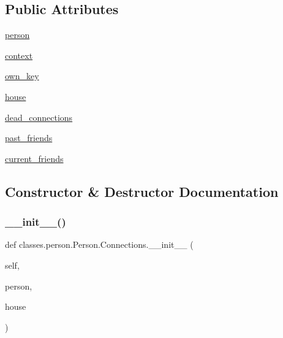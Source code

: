 \subsection*{Public Attributes}
\begin{DoxyCompactItemize}
\item 
\hyperlink{classclasses_1_1person_1_1Person_1_1Connections_a7106d04e396d6fd3c4adab956767b97b}{person}
\item 
\hyperlink{classclasses_1_1person_1_1Person_1_1Connections_a03cf3f7d68e8e9d24de89055b69fc104}{context}
\item 
\hyperlink{classclasses_1_1person_1_1Person_1_1Connections_a41fa23329c06c4d85fe01ac582787c9b}{own\+\_\+key}
\item 
\hyperlink{classclasses_1_1person_1_1Person_1_1Connections_a80dd3f370e85960b4420131f9eddc20e}{house}
\item 
\hyperlink{classclasses_1_1person_1_1Person_1_1Connections_a7264ca5238579079afff698153fc301f}{dead\+\_\+connections}
\item 
\hyperlink{classclasses_1_1person_1_1Person_1_1Connections_acfaf3323a9c7f95cee53f45811f9bf05}{past\+\_\+friends}
\item 
\hyperlink{classclasses_1_1person_1_1Person_1_1Connections_ac2445635696a61506416290ad8e80ad2}{current\+\_\+friends}
\end{DoxyCompactItemize}


\subsection{Constructor \& Destructor Documentation}
\mbox{\label{classclasses_1_1person_1_1Person_1_1Connections_a26784603675515a5591a86e2c05c235f}} 
\subsubsection{\texorpdfstring{\+\_\+\+\_\+init\+\_\+\+\_\+()}{\_\_init\_\_()}}
{\footnotesize\ttfamily def classes.\+person.\+Person.\+Connections.\+\_\+\+\_\+init\+\_\+\+\_\+ (\begin{DoxyParamCaption}\item[{}]{self,  }\item[{}]{person,  }\item[{}]{house }\end{DoxyParamCaption})}



